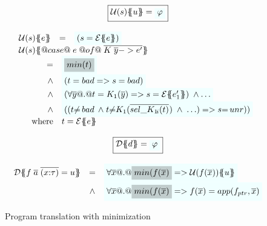 \begin{figure}\small
\setlength{\arraycolsep}{2pt}
\[\begin{array}{c}
\ruleform{\utrans{\Sigma}{u}{s} = \formula{\phi}} \\ \\
\begin{array}{rcl}
\utrans{\Sigma}{e}{s}
  & = & \formula{(s = \etrans{\Sigma}{\Gamma}{e})} \\
\multicolumn{3}{l}{\utrans{\Sigma}
    {@case@\;e\;@of@\;\ol{K\;\ol{y} -> e'}}{s}} \\
\multicolumn{3}{l}{
\quad
  \begin{array}[t]{rl}
    =     & \formula{\highlight{min(t)}} \\
    \land & \formula{(t = \bad => s = bad)} \\
    \land & \formula{(\forall \ol{y} @.@ t = K_1(\ol{y}) => s = \etrans{\Sigma}{\Gamma}{e'_1})\;\land \ldots}  \\
    \land & \formula{((t{\neq}\bad\;\land\;
                 t{\neq}K_1(\oln{{\sel{K_1}{i}}(t)}{})\;\land\;\ldots) => s{=}\unr))} \\
    \mbox{where} & t  =  \etrans{\Sigma}{\Gamma}{e}
 \end{array}
}
\end{array}
\\ \\
\ruleform{\dtrans{\Sigma}{d} = \formula{\phi}} \\ \\
\begin{array}{rcl}
  \dtrans{\Sigma}{f \;\ol{a}\;\ol{(x{:}\tau)} = u}
    & =     & \formula{\forall \ol{x} @.@ \highlight{min(f(\ol{x})} => \utrans{\sigma}{u}{f(\ol{x})}} \\
    & \land & \formula{\forall \ol{x} @.@ \highlight{min(f(\ol{x})} => f(\ol{x}) = app(f_{ptr},\xs)} \\
\end{array}
\end{array}\]
\caption{Program translation with minimization}\label{fig:min-def-trans-min}
\end{figure}

